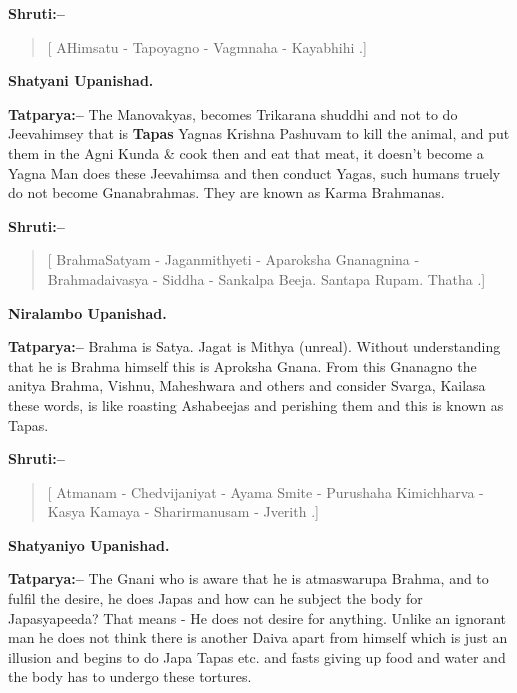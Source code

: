 \textbf{Shruti:–}

\begin{verse}
[ AHimsatu - Tapoyagno - Vagmnaha - Kayabhihi .]
\end{verse}

\begin{flushright}
\textbf{Shatyani Upanishad.}
\end{flushright}

\textbf{Tatparya:–} The Manovakyas, becomes Trikarana shuddhi and not to do Jeevahimsey that is \textbf{Tapas} Yagnas Krishna Pashuvam to kill the animal, and put them in the Agni Kunda \& cook then and eat that meat, it doesn't become a Yagna Man does these Jeevahimsa and then conduct Yagas, such humans truely do not become Gnanabrahmas. They are known as Karma Brahmanas.

\textbf{Shruti:–}

\begin{verse}
[ BrahmaSatyam - Jaganmithyeti - Aparoksha Gnana\break gnina - Brahmadaivasya - Siddha - Sankalpa Beeja. Santapa Rupam. Thatha .]
\end{verse}

\begin{flushright}
\textbf{Niralambo Upanishad.}
\end{flushright}

\textbf{Tatparya:–} Brahma is Satya. Jagat is Mithya (unreal). Without understanding that he is Brahma himself this is Aproksha Gnana. From this Gnanagno the anitya Brahma, Vishnu, Maheshwara and others and consider Svarga, Kailasa these words, is like roasting Ashabeejas and perishing them and this is known as Tapas.

\newpage

\textbf{Shruti:–}

\begin{verse}
[ Atmanam - Chedvijaniyat - Ayama Smite - Puru\break shaha  Kimichharva - Kasya Kamaya - Sharirmanusam - Jverith .]
\end{verse}

\begin{flushright}
\textbf{Shatyaniyo Upanishad.}
\end{flushright}

\textbf{Tatparya:–} The Gnani who is aware that he is atmaswarupa Brahma, and to fulfil the desire, he does Japas and how can he subject the body for Japasyapeeda? That means - He does not desire for anything. Unlike an ignorant man he does not think there is another Daiva apart from himself which is just an illusion and begins to do Japa Tapas etc. and fasts giving up food and water and the body has to undergo these tortures.

